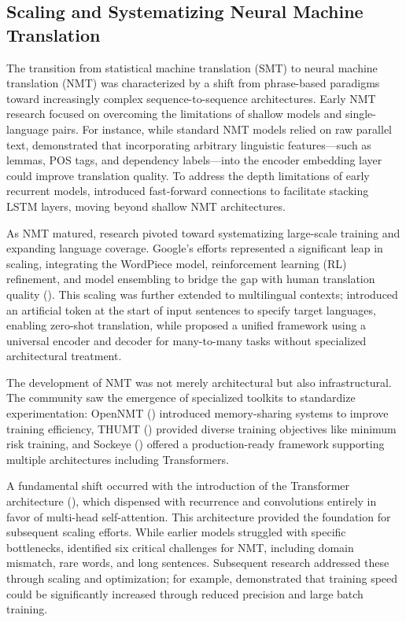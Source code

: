 \documentclass[11pt]{article}
\begin{document}
\subsection{Scaling and Systematizing Neural Machine Translation}

The transition from statistical machine translation (SMT) to neural machine translation (NMT) was characterized by a shift from phrase-based paradigms toward increasingly complex sequence-to-sequence architectures. Early NMT research focused on overcoming the limitations of shallow models and single-language pairs. For instance, while standard NMT models relied on raw parallel text, \citep{1606.02892} demonstrated that incorporating arbitrary linguistic features—such as lemmas, POS tags, and dependency labels—into the encoder embedding layer could improve translation quality. To address the depth limitations of early recurrent models, \citep{1606.04199} introduced fast-forward connections to facilitate stacking LSTM layers, moving beyond shallow NMT architectures.

As NMT matured, research pivoted toward systematizing large-scale training and expanding language coverage. Google's efforts represented a significant leap in scaling, integrating the WordPiece model, reinforcement learning (RL) refinement, and model ensembling to bridge the gap with human translation quality (\citep{1609.08144}). This scaling was further extended to multilingual contexts; \citep{1611.04558} introduced an artificial token at the start of input sentences to specify target languages, enabling zero-shot translation, while \citep{1611.04798} proposed a unified framework using a universal encoder and decoder for many-to-many tasks without specialized architectural treatment.

The development of NMT was not merely architectural but also infrastructural. The community saw the emergence of specialized toolkits to standardize experimentation: OpenNMT (\citep{1701.02810}) introduced memory-sharing systems to improve training efficiency, THUMT (\citep{1706.06415}) provided diverse training objectives like minimum risk training, and Sockeye (\citep{1712.05690}) offered a production-ready framework supporting multiple architectures including Transformers.

A fundamental shift occurred with the introduction of the Transformer architecture (\citep{1706.03762}), which dispensed with recurrence and convolutions entirely in favor of multi-head self-attention. This architecture provided the foundation for subsequent scaling efforts. While earlier models struggled with specific bottlenecks, \citep{1706.03872} identified six critical challenges for NMT, including domain mismatch, rare words, and long sentences. Subsequent research addressed these through scaling and optimization; for example, \citep{1806.00187} demonstrated that training speed could be significantly increased through reduced precision and large batch training.
\end{document}
